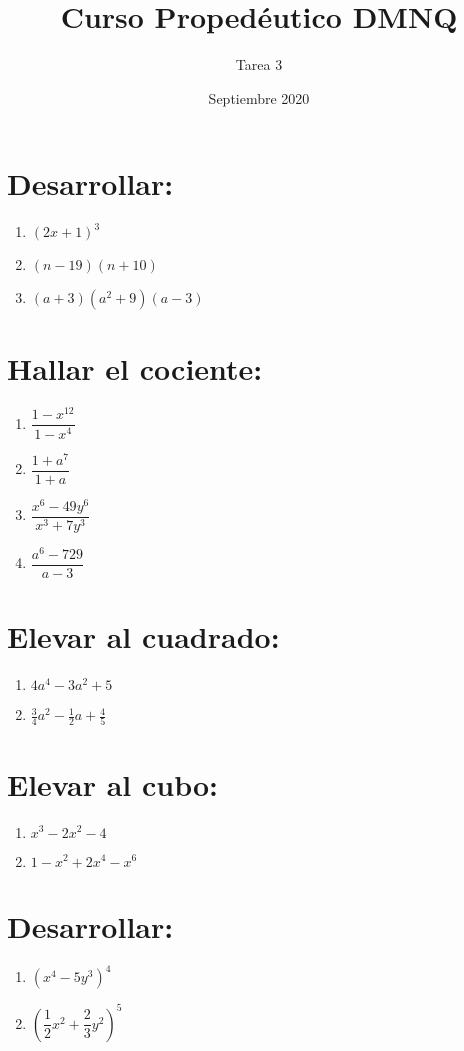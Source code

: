 \documentclass{article}
\title{Curso Propedéutico DMNQ}
\author{Tarea 3}
\date{Septiembre 2020}
\begin{document}
\maketitle

\section*{Desarrollar:}

\begin{enumerate}
    \item $(2x + 1)^3$
    \item $(n - 19)(n + 10)$
    \item $(a + 3)(a^2 + 9)(a - 3)$
\end{enumerate}

\section*{Hallar el cociente:}

\begin{enumerate}
    \item $\dfrac{1 - x^{12}}{1-x^4}$
    \item $\dfrac{1+a^7}{1+a}$
    \item $\dfrac{x^6-49y^6}{x^3+7y^3}$
    \item $\dfrac{a^6-729}{a-3}$
\end{enumerate}

\section*{Elevar al cuadrado:}

\begin{enumerate}
    \item $4a^4 - 3a^2 + 5$
    \item $\frac{3}{4}a^2-\frac{1}{2}a+\frac{4}{5}$
\end{enumerate}

\section*{Elevar al cubo:}

\begin{enumerate}
    \item $x^3 - 2x^2 - 4$
    \item $1 - x^2 + 2x^4 - x^6$
\end{enumerate}

\section*{Desarrollar:}

\begin{enumerate}
    \item $(x^4 - 5y^3)^4$
    \item $(\dfrac{1}{2}x^2 +\dfrac{2}{3} y^2)^5$
\end{enumerate}
\end{document}
